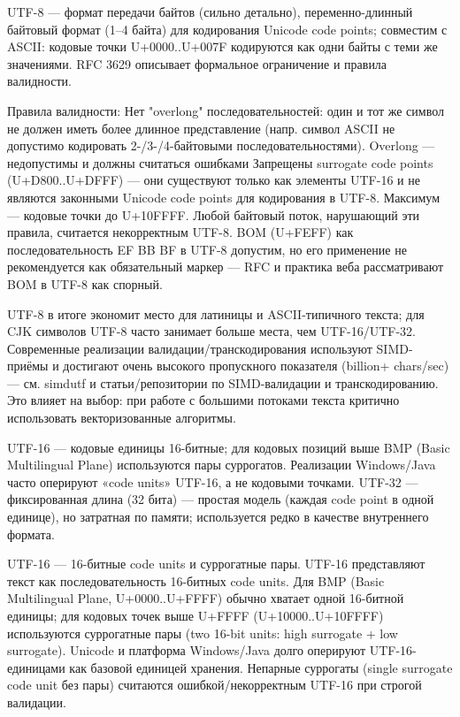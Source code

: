\documentclass{ou}
\begin{document}
UTF-8 — формат передачи байтов (сильно детально), переменно-длинный байтовый формат (1--4 байта) для кодирования Unicode code points; совместим с ASCII: кодовые точки U+0000..U+007F кодируются как одни байты с теми же значениями. RFC 3629 описывает формальное ограничение и правила валидности. 

Правила валидности: Нет "overlong" последовательностей: один и тот же символ не должен иметь более длинное представление (напр. символ ASCII не допустимо кодировать 2-/3-/4-байтовыми последовательностями). Overlong — недопустимы и должны считаться ошибками Запрещены surrogate code points (U+D800..U+DFFF) — они существуют только как элементы UTF-16 и не являются законными Unicode code points для кодирования в UTF-8.  Максимум — кодовые точки до U+10FFFF. Любой байтовый поток, нарушающий эти правила, считается некорректным UTF-8. BOM (U+FEFF) как последовательность EF BB BF в UTF-8 допустим, но его применение не рекомендуется как обязательный маркер — RFC и практика веба рассматривают BOM в UTF-8 как спорный.

UTF-8 в итоге экономит место для латиницы и ASCII-типичного текста; для CJK символов UTF-8 часто занимает больше места, чем UTF-16/UTF-32. Современные реализации валидации/транскодирования используют SIMD-приёмы и достигают очень высокого пропускного показателя (billion+ chars/sec) — см. simdutf и статьи/репозитории по SIMD-валидации и транскодированию. Это влияет на выбор: при работе с большими потоками текста критично использовать векторизованные алгоритмы. 

UTF-16 — кодовые единицы 16-битные; для кодовых позиций выше BMP (Basic Multilingual Plane) используются пары суррогатов. Реализации Windows/Java часто оперируют «code units» UTF-16, а не кодовыми точками. UTF-32 — фиксированная длина (32 бита) — простая модель (каждая code point в одной единице), но затратная по памяти; используется редко в качестве внутреннего формата. 

UTF-16 — 16-битные code units и суррогатные пары. UTF-16 представляют текст как последовательность 16-битных code units. Для BMP (Basic Multilingual Plane, U+0000..U+FFFF) обычно хватает одной 16-битной единицы; для кодовых точек выше U+FFFF (U+10000..U+10FFFF) используются суррогатные пары (two 16-bit units: high surrogate + low surrogate). Unicode и платформа Windows/Java долго оперируют UTF-16-единицами как базовой единицей хранения. Непарные суррогаты (single surrogate code unit без пары) считаются ошибкой/некорректным UTF-16 при строгой валидации. 
\end{document}
